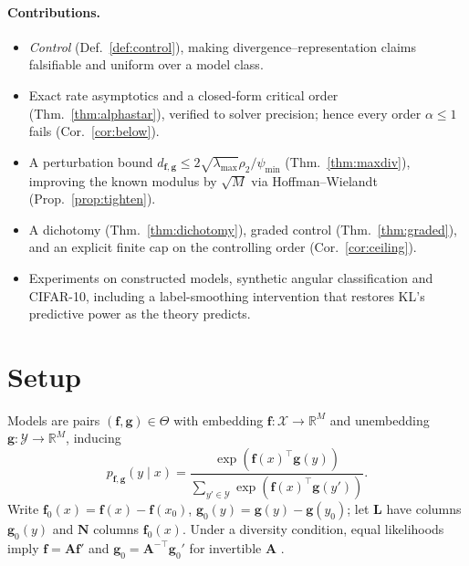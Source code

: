 \documentclass[10pt,letterpaper,twocolumn]{article}
\newcommand{\TODO}[1]{}
\newcommand{\X}{\mathcal{X}}
\newcommand{\Y}{\mathcal{Y}}
\newcommand{\bff}{\mathbf{f}}
\newcommand{\bfg}{\mathbf{g}}
\newcommand{\bfL}{\mathbf{L}}
\newcommand{\bfN}{\mathbf{N}}
\newcommand{\dSVD}{d_{\mathrm{SVD}}}
\newcommand{\dfg}{d_{\bff,\bfg}}
\theoremstyle{plain}
\theoremstyle{definition}
\theoremstyle{remark}
\begin{document}
\paragraph{Contributions.}
\begin{itemize}[leftmargin=1.2em,itemsep=1pt,topsep=2pt]
\item \emph{Control} (Def.~\ref{def:control}), making divergence--representation
      claims falsifiable and uniform over a model class.
\item Exact rate asymptotics and a closed-form critical order
      (Thm.~\ref{thm:alphastar}), verified to solver precision; hence every
      order $\alpha\le1$ fails (Cor.~\ref{cor:below}).
\item A perturbation bound $\dfg\le2\sqrt{\lambda_{\max}}\rho_{2}/\psi_{\min}$
      (Thm.~\ref{thm:maxdiv}), improving the known modulus by $\sqrt{M}$ via
      Hoffman--Wielandt (Prop.~\ref{prop:tighten}).
\item A dichotomy (Thm.~\ref{thm:dichotomy}), graded control
      (Thm.~\ref{thm:graded}), and an explicit finite cap on the controlling
      order (Cor.~\ref{cor:ceiling}).
\item Experiments on constructed models, synthetic angular classification and
      CIFAR-10, including a label-smoothing intervention that restores KL's
      predictive power as the theory predicts.
\end{itemize}

\section{Setup}
\label{sec:setup}

Models are pairs $(\bff,\bfg)\in\Theta$ with embedding
$\bff:\X\to\mathbb{R}^{M}$ and unembedding $\bfg:\Y\to\mathbb{R}^{M}$, inducing
\begin{equation}
p_{\bff,\bfg}(y\mid x)=\frac{\exp(\bff(x)^{\top}\bfg(y))}
{\sum_{y'\in\Y}\exp(\bff(x)^{\top}\bfg(y'))}.
\label{eq:model}
\end{equation}
Write $\bff_{0}(x)=\bff(x)-\bff(x_{0})$, $\bfg_{0}(y)=\bfg(y)-\bfg(y_{0})$; let
$\bfL$ have columns $\bfg_{0}(y)$ and $\bfN$ columns $\bff_{0}(x)$. Under a
diversity condition, equal likelihoods imply $\bff=\mathbf{A}\bff'$ and
$\bfg_{0}=\mathbf{A}^{-\top}\bfg_{0}'$ for invertible $\mathbf{A}$
\cite{roeder2021,khemakhem2020,lachapelle2023}.

\TODO{Compress to $\approx$0.6 column. Restate diversity and linear
identifiability as background; cite, do not reprove. Recall $\dSVD$ and $\dfg$;
defer the comparison with CCA-based measures to Sec.~\ref{sec:discussion}.}
\end{document}
